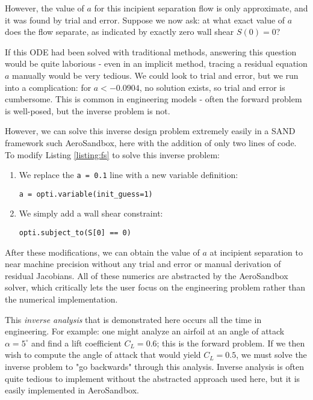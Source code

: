 However, the value of $a$ for this incipient separation flow is only approximate, and it was found by trial and error. Suppose we now ask: at what exact value of $a$ does the flow separate, as indicated by exactly zero wall shear $S(0)=0$?

If this ODE had been solved with traditional methods, answering this question would be quite laborious - even in an implicit method, tracing a residual equation $a$ manually would be very tedious. We could look to trial and error, but we run into a complication: for $a<-0.0904$, no solution exists, so trial and error is cumbersome. This is common in engineering models - often the forward problem is well-posed, but the inverse problem is not.

However, we can solve this inverse design problem extremely easily in a SAND framework such AeroSandbox, here with the addition of only two lines of code. To modify Listing \ref{listing:fs} to solve this inverse problem:

\begin{enumerate}[noitemsep]

    \item We replace the \texttt{a = 0.1} line with a new variable definition:
    \begin{verbatim}
a = opti.variable(init_guess=1)
    \end{verbatim}

    \item We simply add a wall shear constraint:
    \begin{verbatim}
opti.subject_to(S[0] == 0)
    \end{verbatim}

\end{enumerate}

After these modifications, we can obtain the value of $a$ at incipient separation to near machine precision without any trial and error or manual derivation of residual Jacobians. All of these numerics are abstracted by the AeroSandbox solver, which critically lets the user focus on the engineering problem rather than the numerical implementation.

This \textit{inverse analysis} that is demonstrated here occurs all the time in engineering. For example: one might analyze an airfoil at an angle of attack $\alpha = 5^\circ$ and find a lift coefficient $C_L = 0.6$; this is the forward problem. If we then wish to compute the angle of attack that would yield $C_L=0.5$, we must solve the inverse problem to "go backwards" through this analysis. Inverse analysis is often quite tedious to implement without the abstracted approach used here, but it is easily implemented in AeroSandbox.
